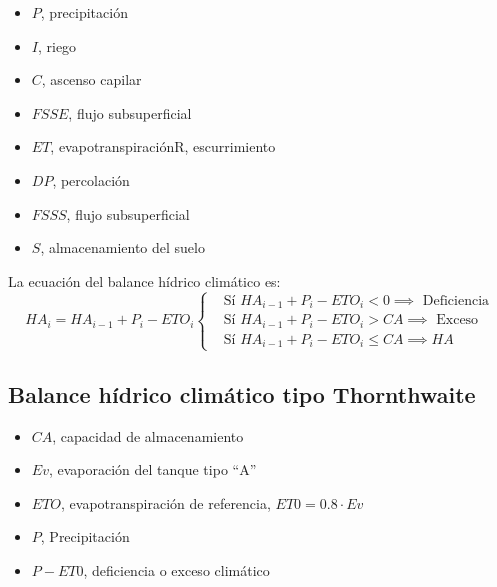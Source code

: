     \begin{notation}
    \begin{itemize}
        \item $P$, precipitación
        \item $I$, riego
        \item $C$, ascenso capilar
        \item $FSSE$, flujo subsuperficial
        \item $ET$, evapotranspiraciónR, escurrimiento
        \item $DP$, percolación
        \item $FSSS$, flujo subsuperficial
        \item $S$, almacenamiento del suelo
    \end{itemize}
    \end{notation}
    
    La ecuación del balance hídrico climático es:
    \begin{equation}
        HA_i=HA_{i- 1}+P_i-ETO_i
        \begin{cases} 
            &\text{Sí }HA_{i-1}+P_i-ETO_i<0\implies\text{ Deficiencia}\\  
            &\text{Sí }HA_{i-1}+P_i-ETO_i >CA\implies\text{ Exceso}\\
            &\text{Sí }HA_{i- 1}+P_i-ETO_i\leq CA\implies HA
        \end{cases} 
    \end{equation}
    
    \subsection{Balance hídrico climático tipo Thornthwaite}
    \begin{notation}
        \begin{itemize}
            \item $CA$, capacidad de almacenamiento
    
            \item $Ev$, evaporación del tanque tipo ``A'' 
            \item $ETO$, evapotranspiración de referencia, $ET0 = 0.8\cdot Ev $
            \item $P$, Precipitación
            \item $P- ET0$, deficiencia o exceso climático
        \end{itemize}
        \end{notation}
    
